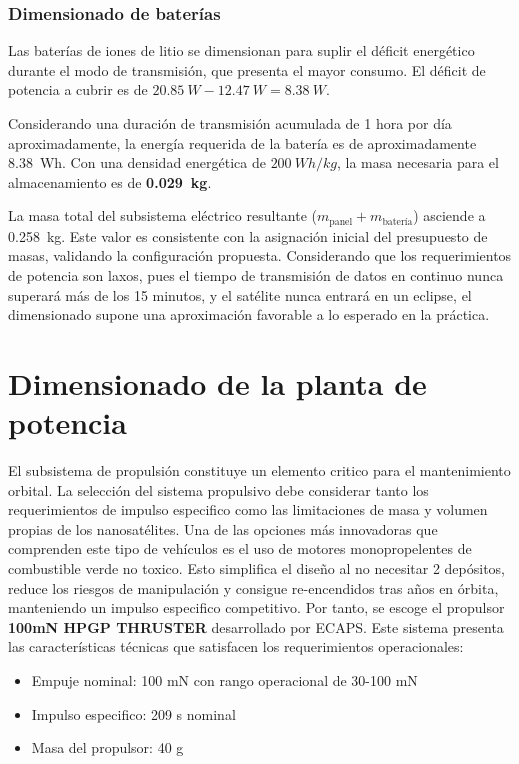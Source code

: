 \subsubsection{Dimensionado de baterías}

Las baterías de iones de litio se dimensionan para suplir el déficit energético durante el modo de transmisión, que presenta el mayor consumo. El déficit de potencia a cubrir es de \(\SI{20,85}{W} - \SI{12,47}{W} = \SI{8,38}{W}\).

Considerando una duración de transmisión acumulada de 1 hora por día aproximadamente, la energía requerida de la batería es de aproximadamente \SI{8,38}{Wh}. Con una densidad energética de \(\SI{200}{Wh/kg}\), la masa necesaria para el almacenamiento es de \textbf{\SI{0,029}{kg}}\cite{sunket2025lithium}.

La masa total del subsistema eléctrico resultante (\(m_{\text{panel}} + m_{\text{batería}}\)) asciende a \SI{0,258}{kg}. Este valor es consistente con la asignación inicial del presupuesto de masas, validando la configuración propuesta. Considerando que los requerimientos de potencia son laxos, pues el tiempo de transmisión de datos en continuo nunca superará más de los 15 minutos, y el satélite nunca entrará en un eclipse, el dimensionado supone una aproximación favorable a lo esperado en la práctica.


\section{Dimensionado de la planta de potencia}

El subsistema de propulsión constituye un elemento critico para el mantenimiento orbital. La selección del sistema propulsivo debe considerar tanto los requerimientos de impulso especifico como las limitaciones de masa y volumen propias de los nanosatélites. Una de las opciones m\'as innovadoras que comprenden este tipo de vehículos es el uso de motores monopropelentes de combustible verde no toxico. Esto simplifica el diseño al no necesitar 2 depósitos, reduce los riesgos de manipulación y consigue re-encendidos tras a\~nos en \'orbita, manteniendo un impulso especifico competitivo. Por tanto, se escoge el propulsor \textbf{100mN HPGP THRUSTER} desarrollado por ECAPS. Este sistema presenta las características técnicas que satisfacen los requerimientos operacionales:

\begin{itemize}
    \item Empuje nominal: 100 mN con rango operacional de 30-100 mN
    \item Impulso especifico: 209 s nominal
    \item Masa del propulsor: 40 g
\end{itemize}

